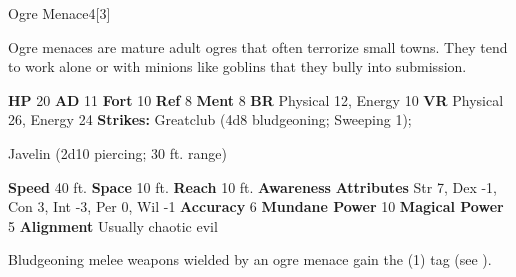   

  \begin{monsubsection}{Ogre Menace}{4}[3]
    \vspace{-1em}\vspace{-1em}
    \vspace{0em}

    
          Ogre menaces are mature adult ogres that often terrorize small towns.
          They tend to work alone or with minions like goblins that they bully into submission.
        

    \begin{spellcontent}
      \begin{spelltargetinginfo}
        \pari \textbf{HP} 20 \monsep
          \textbf{AD} 11 \monsep
          \textbf{Fort} 10 \monsep
          \textbf{Ref} 8 \monsep
          \textbf{Ment} 8
        \pari \textbf{BR} Physical 12, Energy 10 \monsep
        \textbf{VR} Physical 26, Energy 24
        \pari \textbf{Strikes:}
            Greatclub  (4d8 bludgeoning; Sweeping 1);
\par Javelin  (2d10 piercing; 30 ft. range)
      \end{spelltargetinginfo}
    \end{spellcontent}
    \begin{monsterfooter}
      \pari \textbf{Speed} 40 ft. \monsep
        \textbf{Space} 10 ft. \monsep
        \textbf{Reach} 10 ft.
      \pari \textbf{Awareness} 
      \pari \textbf{Attributes}
        Str 7, Dex -1,
        Con 3, Int -3,
        Per 0, Wil -1
      \pari \textbf{Accuracy} 6 \monsep
        \textbf{Mundane Power} 10 \monsep
      \textbf{Magical Power} 5
      \pari \textbf{Alignment} Usually chaotic evil
    \end{monsterfooter}
  \end{monsubsection}
            Bludgeoning melee weapons wielded by an ogre menace gain the  (1) tag (see ).
  

